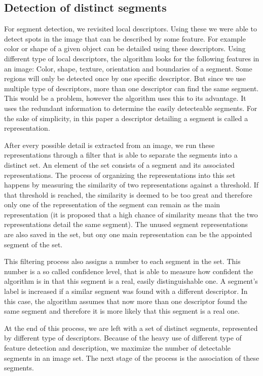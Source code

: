 \subsection{Detection of distinct segments} %
For segment detection, we revisited local descriptors. Using these we were able to detect spots in the image that can be described by some feature. For example color or shape of a given object can be detailed using these descriptors. Using different type of local descriptors, the algorithm looks for the following features in an image: Color, shape, texture, orientation and boundaries of a segment. Some regions will only be detected once by one specific descriptor. But since we use multiple type of descriptors, more than one descriptor can find the same segment. This would be a problem, however the algorithm uses this to its advantage. It uses the redundant information to determine the easily detecteable segments. For the sake of simplicity, in this paper a descriptor detailing a segment is called a representation.

After every possible detail is extracted from an image, we run these representations through a filter that is able to separate the segments into a distinct set. An element of the set consists of a segment and its associated representations. The process of organizing the representations into this set happens by measuring the similarity of two representations against a threshold. If that threshold is reached, the similarity is deemed to be too great and therefore only one of the representation of the segment can remain as the main representation (it is proposed that a high chance of similarity means that the two representations detail the same segment). The unused segment representations are also saved in the set, but ony one main representation can be the appointed segment of the set.  

This filtering process also assigns a number to each segment in the set. This number is a so called confidence level, that is able to measure how confident the algorithm is in that this segment is a real, easily distinguishable one. A segment's label is increased if a similar segment was found with a different descriptor. In this case, the algorithm assumes that now more than one descriptor found the same segment and therefore it is more likely that this segment is a real one. 


At the end of this process, we are left with a set of distinct segments, represented by different type of descriptors. Because of the heavy use of different type of feature detection and description, we maximize the number of detectable segments in an image set. The next stage of the process is the association of these segments.

